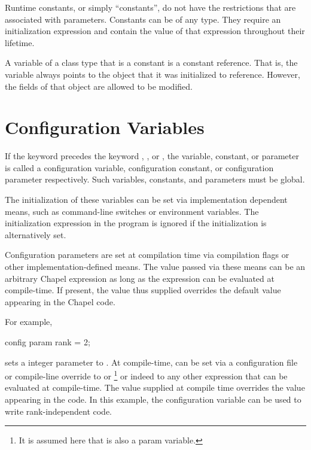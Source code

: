 Runtime constants, or simply ``constants'',
do not have the restrictions that are associated with
parameters.  Constants can be of any type.  They require an initialization
expression and contain the value of that expression throughout their lifetime.

A variable of a class type that is a constant is a constant reference.
That is, the variable always
points to the object that it was initialized to reference.
However, the fields of that object are allowed to be modified.

\section{Configuration Variables}
\label{Configuration_Variables}

If the keyword  precedes the
keyword , , or , the variable,
constant, or parameter is called a configuration variable,
configuration constant, or configuration parameter respectively.  Such
variables, constants, and parameters must be global.

The initialization of these variables can be set via implementation
dependent means, such as command-line switches or environment
variables.  The initialization expression in the program is ignored if
the initialization is alternatively set.

Configuration parameters are set at compilation time via compilation
flags or other implementation-defined means.  The value passed via
these means can be an arbitrary Chapel expression as long as the
expression can be evaluated at compile-time.  If present, the value thus
supplied overrides the default value appearing in the Chapel code.

\begin{example}
For example,
\begin{chapel}
config param rank = 2;
\end{chapel}
sets a integer parameter  to .  At
compile-time,  can be set via a configuration file or compile-line
override to  or \footnote{It is assumed here that  is
also a param variable.} or indeed to any other expression
that can be evaluated at compile-time.  The value supplied at compile time
overrides the value  appearing in the code.  In this example, the 
configuration variable can be used to write rank-independent code.
\end{example}
